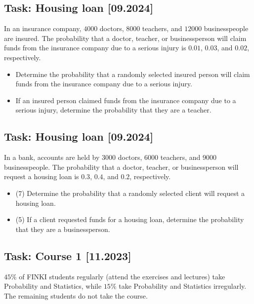 \documentclass[a4paper, 12pt]{article}
\begin{document}
\subsection*{Task: Housing loan [09.2024]}

In an insurance company, $4000$ doctors, $8000$ teachers, and $12000$ businesspeople are insured. The probability that a doctor, teacher, or businessperson will claim funds from the insurance company due to a serious injury is $0.01$, $0.03$, and $0.02$, respectively.



\begin{itemize}
    \item [a)] Determine the probability that a randomly selected insured person will claim funds from the insurance company due to a serious injury.
    \item [b)] If an insured person claimed funds from the insurance company due to a serious injury, determine the probability that they are a teacher.
\end{itemize}


\subsection*{Task: Housing loan [09.2024]}

In a bank, accounts are held by $3000$ doctors, 6000 teachers, and 9000 businesspeople. The probability that a doctor, teacher, or businessperson will request a housing loan is $0.3$, $0.4$, and $0.2$, respectively.

\begin{itemize}
    \item [a)] (7) Determine the probability that a randomly selected client will request a housing loan.
    \item [b)] (5) If a client requested funds for a housing loan, determine the probability that they are a businessperson.
\end{itemize}




\subsection*{Task: Course 1 [11.2023]}

$45\%$ of FINKI students regularly (attend the exercises and lectures) take Probability and Statistics, while $15\%$ take Probability and Statistics irregularly. The remaining students do not take the course.
\end{document}
